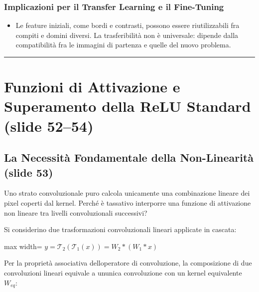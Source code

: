 \documentclass[11pt,a4paper,oneside,openany]{book}
\providecommand{\tightlist}{\setlength{\itemsep}{0pt}\setlength{\parskip}{0pt}}
\begin{document}
\subsubsection{Implicazioni per il Transfer Learning e il Fine-Tuning}\label{f02-r705}

\begin{itemize}
\tightlist
\item
  Le feature iniziali, come bordi e contrasti, possono essere riutilizzabili fra compiti e domini diversi. La trasferibilità non è universale: dipende dalla compatibilità fra le immagini di partenza e quelle del nuovo problema.
\end{itemize}

\begin{center}\rule{0.5\linewidth}{0.5pt}\end{center}

\section{Funzioni di Attivazione e Superamento della ReLU Standard (slide 52--54)}\label{f02-r711}

\subsection{La Necessità Fondamentale della Non-Linearità (slide 53)}\label{f02-r713}

Uno strato convoluzionale puro calcola unicamente una combinazione lineare dei pixel coperti dal kernel. Perché è tassativo interporre una funzione di attivazione non lineare tra livelli convoluzionali successivi?

Si considerino due trasformazioni convoluzionali lineari applicate in cascata:

\begin{center}
\begin{adjustbox}{max width=\linewidth}
$\displaystyle 
y = \mathcal{T}_2(\mathcal{T}_1(x)) = W_2 * (W_1 * x)
$
\end{adjustbox}
\end{center}

Per la proprietà associativa dell\textquotesingle operatore di convoluzione, la composizione di due convoluzioni lineari equivale a un\textquotesingle unica convoluzione con un kernel equivalente \(W_{eq}\):
\end{document}
